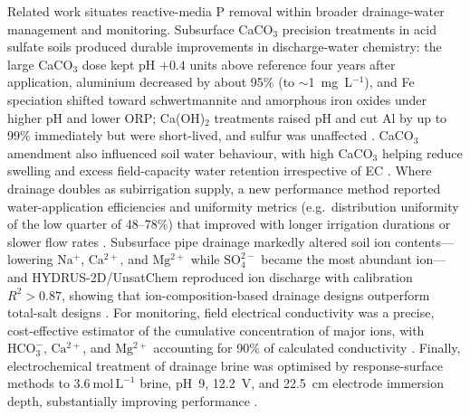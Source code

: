 Related work situates reactive-media P removal within broader drainage-water
management and monitoring. Subsurface CaCO$_3$ precision treatments in acid
sulfate soils produced durable improvements in discharge-water chemistry: the
large CaCO$_3$ dose kept pH $+0.4$ units above reference four years after
application, aluminium decreased by about 95\% (to $\sim$1~mg~L$^{-1}$), and Fe
speciation shifted toward schwertmannite and amorphous iron oxides under higher
pH and lower ORP; Ca(OH)$_2$ treatments raised pH and cut Al by up to 99\%
immediately but were short-lived, and sulfur was unaffected \parencite{Dalhem2019}.
CaCO$_3$ amendment also influenced soil water behaviour, with high CaCO$_3$
helping reduce swelling and excess field-capacity water retention irrespective of
EC \parencite{He2015}. Where drainage doubles as subirrigation supply, a new
performance method reported water-application efficiencies and uniformity metrics
(e.g.\ distribution uniformity of the low quarter of 48--78\%) that improved with
longer irrigation durations or slower flow rates \parencite{Jia2017}. Subsurface
pipe drainage markedly altered soil ion contents---lowering $\mathrm{Na^+}$,
$\mathrm{Ca^{2+}}$, and $\mathrm{Mg^{2+}}$ while $\mathrm{SO_4^{2-}}$ became the
most abundant ion---and HYDRUS-2D/UnsatChem reproduced ion discharge with
calibration $R^2 > 0.87$, showing that ion-composition-based drainage designs
outperform total-salt designs \parencite{Liu2025b}. For monitoring, field
electrical conductivity was a precise, cost-effective estimator of the cumulative
concentration of major ions, with $\mathrm{HCO_3^-}$, $\mathrm{Ca^{2+}}$, and
$\mathrm{Mg^{2+}}$ accounting for 90\% of calculated conductivity
\parencite{Zimmerman2017}. Finally, electrochemical treatment of drainage brine
was optimised by response-surface methods to $3.6~\mathrm{mol\,L^{-1}}$ brine,
pH~9, 12.2~V, and 22.5~cm electrode immersion depth, substantially improving
performance \parencite{Yang2023}.